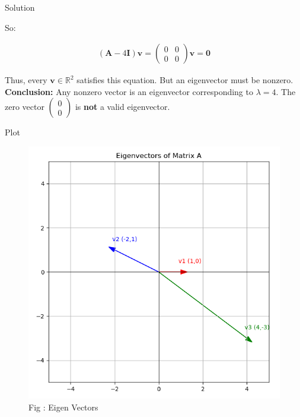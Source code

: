 \documentclass{beamer}
\numberwithin{equation}{section}
\theoremstyle{remark}
\newcommand{\myvec}[1]{\ensuremath{\begin{pmatrix}#1\end{pmatrix}}}
\let\vec\mathbf
\begin{document}
\begin{frame}{Solution}

So:

\begin{align}
  (\vec{A}-4\vec{I})\vec{v} = \myvec{0 & 0 \\ 0 & 0}\vec{v} = \vec{0}
\end{align}

Thus, every $\vec{v} \in \mathbb{R}^2$ satisfies this equation.  
But an eigenvector must be nonzero.  \\

\textbf{Conclusion:} Any nonzero vector is an eigenvector corresponding to $\lambda=4$.  
The zero vector $\myvec{0\\0}$ is \textbf{not} a valid eigenvector.

\end{frame}

\begin{frame}{Plot}

\begin{figure}[h!]
  \centering
  \includegraphics[width=0.6\columnwidth]{figs/eigenvectors.png} 
   \caption*{Fig : Eigen Vectors}
  \label{Fig1}
\end{figure}

\end{frame}
\end{document}
